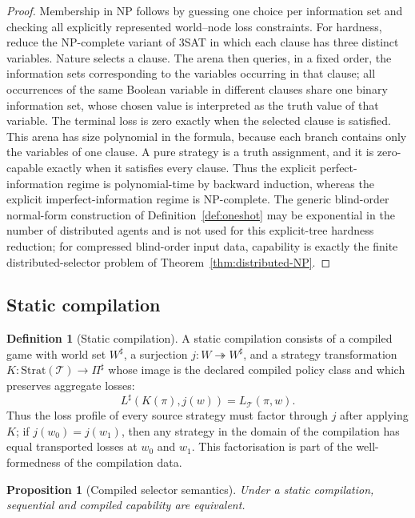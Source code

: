 \documentclass[11pt]{article}
\theoremstyle{plain}
\newtheorem{proposition}[theorem]{Proposition}
\theoremstyle{definition}
\newtheorem{definition}[theorem]{Definition}
\theoremstyle{remark}
\begin{document}
\begin{proof}
Membership in NP follows by guessing one choice per information set and checking
all explicitly represented world--node loss constraints. For hardness, reduce the NP-complete variant \cite{tovey} of 3SAT in which
each clause has three distinct variables. Nature selects a clause. The arena then queries, in a
fixed order, the information sets corresponding to the variables occurring in
that clause;
all occurrences of the same Boolean variable in different clauses share one
binary information set, whose chosen value is interpreted as the truth value of
that variable. The terminal loss is zero exactly when the selected clause is
satisfied. This arena has size polynomial in the formula, because each branch
contains only the variables of one clause. A pure strategy is a truth assignment,
and it is zero-capable exactly when it satisfies every clause. Thus the explicit
perfect-information regime is polynomial-time by backward induction, whereas the
explicit imperfect-information regime is NP-complete. The generic blind-order
normal-form construction of Definition~\ref{def:oneshot} may be exponential in
the number of distributed agents and is not used for this explicit-tree hardness
reduction; for compressed blind-order input data, capability is exactly the
finite distributed-selector problem of Theorem~\ref{thm:distributed-NP}.
\end{proof}




\subsection{Static compilation}

\begin{definition}[Static compilation]\label{def:staticcomp}
A static compilation consists of a compiled game with world set $W^\sharp$, a
surjection $j:W\twoheadrightarrow W^\sharp$, and a strategy transformation
$K:\mathrm{Strat}(\mathcal T)\to\Pi^\sharp$ whose image is the declared
compiled policy class and which preserves aggregate losses:
\[
L^\sharp(K(\pi),j(w))=L_{\mathcal T}(\pi,w).
\]
Thus the loss profile of every source strategy must factor through $j$ after
applying $K$; if $j(w_0)=j(w_1)$, then any strategy in the domain of the
compilation has equal transported losses at $w_0$ and $w_1$. This factorisation
is part of the well-formedness of the compilation data.
\end{definition}

\begin{proposition}[Compiled selector semantics]\label{prop:FBcompile}
Under a static compilation, sequential and compiled capability are equivalent.
\end{proposition}
\end{document}
